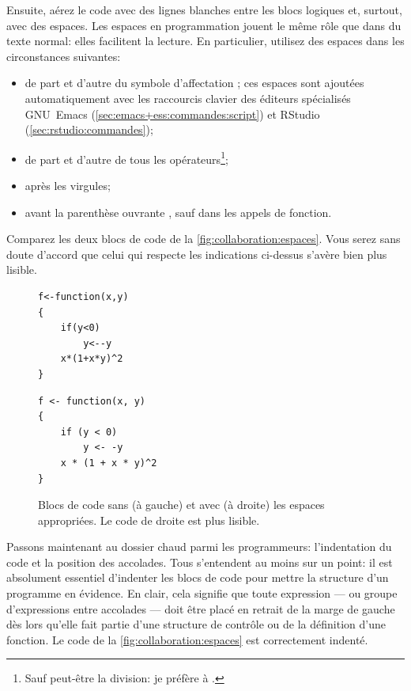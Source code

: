 Ensuite, aérez le code avec des lignes blanches entre les blocs
logiques et, surtout, avec des espaces. Les espaces en programmation
jouent le même rôle que dans du texte normal: elles facilitent la
lecture. En particulier, utilisez des espaces dans les circonstances
suivantes:
\begin{itemize}
\item de part et d'autre du symbole d'affectation \icode{<-}; ces
  espaces sont ajoutées automatiquement avec les raccourcis clavier
  des éditeurs spécialisés GNU~Emacs
  (\autoref{sec:emacs+ess:commandes:script}) et RStudio
  (\autoref{sec:rstudio:commandes});
\item de part et d'autre de tous les opérateurs\footnote{%
    Sauf peut-être la division: je préfère  à .};
\item après les virgules;
\item avant la parenthèse ouvrante \code{(}, sauf dans les appels de
  fonction.
\end{itemize}
Comparez les deux blocs de code de la
\autoref{fig:collaboration:espaces}. Vous serez sans doute d'accord
que celui qui respecte les indications ci-dessus s'avère bien plus
lisible.

\begin{figure}
  \begin{minipage}{0.48\linewidth}
    \begin{Schunk}
\begin{Verbatim}
f<-function(x,y)
{
    if(y<0)
        y<--y
    x*(1+x*y)^2
}
\end{Verbatim}
    \end{Schunk}
  \end{minipage}
  \hfill
  \begin{minipage}{0.48\linewidth}
    \begin{Schunk}
\begin{Verbatim}
f <- function(x, y)
{
    if (y < 0)
        y <- -y
    x * (1 + x * y)^2
}
\end{Verbatim}
    \end{Schunk}
  \end{minipage}
  \caption{Blocs de code sans (à gauche) et avec (à droite) les
    espaces appropriées. Le code de droite est plus lisible.}
  \label{fig:collaboration:espaces}
\end{figure}

Passons maintenant au dossier chaud parmi les programmeurs:
l'indentation du code et la position des accolades.
Tous s'entendent au moins sur un point: il est absolument essentiel
d'indenter les blocs de code pour mettre la structure d'un programme
en évidence. En clair, cela signifie que toute expression --- ou
groupe d'expressions entre accolades --- doit être placé en retrait de
la marge de gauche dès lors qu'elle fait partie d'une structure de
contrôle ou de la définition d'une fonction. Le code de la
\autoref{fig:collaboration:espaces} est correctement indenté.

